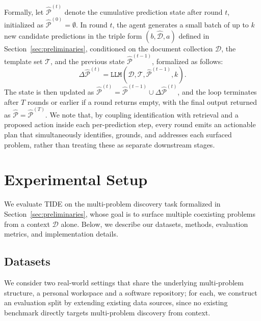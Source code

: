 \documentclass{llmxive}
\begin{document}
Formally, let $\hat{\mathcal{P}}^{(t)}$ denote the cumulative prediction state after round $t$, initialized as $\hat{\mathcal{P}}^{(0)} = \emptyset$. In round $t$, the agent generates a small batch of up to $k$ new candidate predictions in the triple form $(b, \hat{\mathcal{D}}, a)$ defined in Section~\ref{sec:preliminaries}, conditioned on the document collection $\mathcal{D}$, the template set $\mathcal{T}$, and the previous state $\hat{\mathcal{P}}^{(t-1)}$, formalized as follows:
\begin{equation}
\Delta \hat{\mathcal{P}}^{(t)} = \texttt{LLM}\!\left(\mathcal{D}, \mathcal{T}, \hat{\mathcal{P}}^{(t-1)}, k\right).
\label{eq:iterative_discovery}
\end{equation}
The state is then updated as $\hat{\mathcal{P}}^{(t)} = \hat{\mathcal{P}}^{(t-1)} \cup \Delta \hat{\mathcal{P}}^{(t)}$, and the loop terminates after $T$ rounds or earlier if a round returns empty, with the final output returned as $\hat{\mathcal{P}} = \hat{\mathcal{P}}^{(T)}$. We note that, by coupling identification with retrieval and a proposed action inside each per-prediction step, every round emits an actionable plan that simultaneously identifies, grounds, and addresses each surfaced problem, rather than treating these as separate downstream stages.

\section{Experimental Setup}
\label{sec:experimental_setup}
We evaluate \textsc{TIDE} on the multi-problem discovery task formalized in Section~\ref{sec:preliminaries}, whose goal is to surface multiple coexisting problems from a context $\mathcal{D}$ alone. Below, we describe our datasets, methods, evaluation metrics, and implementation details.

\subsection{Datasets}
We consider two real-world settings that share the underlying multi-problem structure, a personal workspace and a software repository; for each, we construct an evaluation split by extending existing data sources, since no existing benchmark directly targets multi-problem discovery from context.
\end{document}
